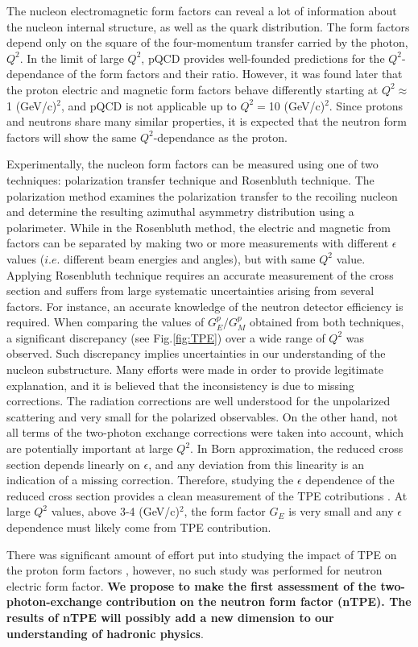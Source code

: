 \documentclass[11pt]{article}
\begin{document}
The nucleon electromagnetic form factors can reveal a lot of information about the nucleon internal structure, as well as the quark distribution. The form factors depend only on the square of the four-momentum transfer carried by the photon, $Q^2$. In the limit of large $Q^2$, pQCD provides well-founded predictions for the $Q^2$-dependance of the form factors and their ratio. However, it was found later \cite{qcd, qcd2} that the proton electric and magnetic form factors behave differently starting at $Q^2 \approx$ 1 (GeV/c)$^2$, and pQCD is not applicable up to $Q^2 = $10 (GeV/c)$^2$. Since protons and neutrons share many similar properties, it is expected that the neutron form factors will show the same $Q^2$-dependance as the proton.
\par
Experimentally, the nucleon form factors can be measured using one of two techniques: polarization transfer technique and Rosenbluth technique. The polarization method examines the polarization transfer to the recoiling nucleon and determine the resulting azimuthal asymmetry distribution using a polarimeter. While in the Rosenbluth method, the electric and magnetic from factors can be separated by making two or more measurements with different $\epsilon$ values ($i.e.$ different beam energies and angles), but with same $Q^2$ value. Applying Rosenbluth technique requires an accurate measurement of the cross section and suffers from large systematic uncertainties arising from several factors. For instance, an accurate knowledge of the neutron detector efficiency is required. When comparing the values of $G_E^p/G_M^p$ obtained from both techniques, a significant discrepancy (see Fig.\ref{fig:TPE}) over a wide range of $Q^2$ was observed. Such discrepancy implies uncertainties in our understanding of the nucleon substructure. Many efforts were made in order to provide legitimate explanation, and it is believed that the inconsistency is due to missing corrections. The radiation corrections are well understood for the unpolarized scattering and very small for the polarized observables. On the other hand, not all terms of the two-photon exchange corrections were taken into account, which are potentially important at large $Q^2$. In Born approximation, the reduced cross section depends linearly on $\epsilon$, and any deviation from this linearity is an indication of a missing correction. Therefore, studying the $\epsilon$ dependence of the reduced cross section provides a clean measurement of the TPE cotributions . At large $Q^2$ values, above 3-4 (GeV/c)$^2$, the form factor $G_E$ is very small and any $\epsilon$ dependence must likely come from TPE contribution.  
\par
There was significant amount of effort put into studying the impact of TPE on the proton form factors \cite{john, gayou}, however, no such study was performed for neutron electric form factor. \textbf{\small We propose to make the first assessment of the two-photon-exchange contribution on the neutron form factor (nTPE). The results of nTPE will possibly add a new dimension to our understanding of hadronic physics}.
\end{document}
